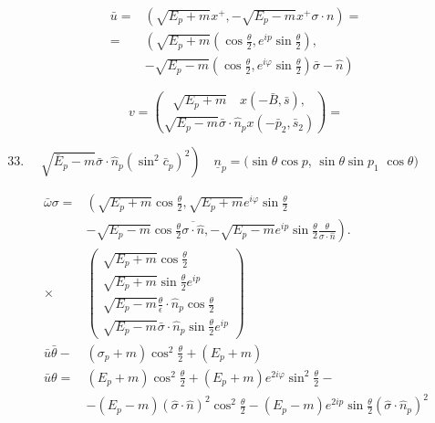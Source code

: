 \documentclass[10pt]{article}
\begin{document}
\[
\begin{aligned}
\bar{u}= & \left(\sqrt{E_{p}+m} x^{+},-\sqrt{E_{p}-m} x^{+} \sigma \cdot n\right)= \\
= & \left(\sqrt{E_{p}+m}\left(\cos \frac{\theta}{2}, e^{i p} \sin \frac{\theta}{2}\right),\right. \\
& \left.-\sqrt{E_{p}-m}\left(\cos \frac{\theta}{2}, e^{i \varphi} \sin \frac{\theta}{2}\right) \bar{\sigma}-\hat{n}\right)
\end{aligned}
\]

\[
v=\binom{\sqrt{E_{p}+m} \quad x(-\bar{B}, \bar{s}),}{\sqrt{E_{p}-m} \bar{\sigma} \cdot \hat{n}_{p} x\left(-\bar{p}_{2}, \bar{s}_{2}\right)}=
\]

\begin{enumerate}
  \setcounter{enumi}{32}
  \item \(\left.\quad \sqrt{\bar{E}_{p}-m} \bar{\sigma} \cdot \hat{n}_{p}\left(\sin ^{2} \bar{c}_{p}\right)^{2}\right) \quad \underline{n}_{p}=(\sin \theta \cos p\), \(\sin \theta \sin p_{1}\) \(\cos \theta)\)
\end{enumerate}

\[
\begin{aligned}
\bar{\omega} \sigma= & \left(\sqrt{E_{p}+m} \cos \frac{\theta}{2}, \sqrt{E_{p}+m} e^{i \varphi} \sin \frac{\theta}{2}\right. \\
& \left.-\sqrt{E_{p}-m} \cos \frac{\theta}{2} \overline{\sigma \cdot \hat{n}},-\sqrt{E_{p}-m} e^{i p} \sin \frac{\theta}{2} \frac{\theta}{\sigma \cdot \hat{n}}\right) . \\
\times & \left(\begin{array}{l}
\sqrt{E_{p}+m} \cos \frac{\theta}{2} \\
\sqrt{E_{p}+m} \sin \frac{\theta}{2} e^{i p} \\
\sqrt{E_{p}-m} \frac{\theta}{\epsilon} \cdot \hat{n}_{p} \cos \frac{\theta}{2} \\
\sqrt{E_{p}-m} \bar{\sigma} \cdot \hat{n}_{p} \sin \frac{\theta}{2} e^{i p}
\end{array}\right) \\
\bar{u} \bar{\theta}- & \left(\sigma_{p}+m\right) \cos ^{2} \frac{\theta}{2}+\left(E_{p}+m\right) \\
\bar{u} \theta= & \left(E_{p}+m\right) \cos ^{2} \frac{\theta}{2}+\left(E_{p}+m\right) e^{2 i \varphi} \sin ^{2} \frac{\theta}{2}- \\
& -\left(E_{p}-m\right)(\hat{\sigma} \cdot \hat{n})^{2} \cos ^{2} \frac{\theta}{2}-\left(E_{p}-m\right) e^{2 i p} \sin \frac{\theta}{2}\left(\hat{\sigma} \cdot \hat{n}_{p}\right)^{2}
\end{aligned}
\]
\end{document}
